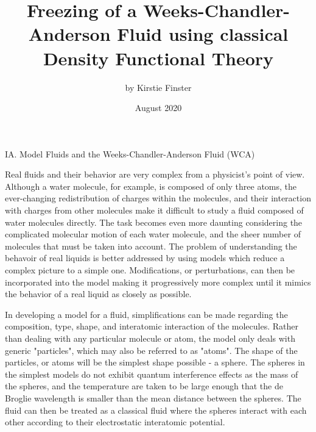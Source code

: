 \documentclass[12pt]{article}
\title{Freezing of a Weeks-Chandler-Anderson Fluid using classical Density Functional Theory}
\author{by Kirstie Finster}
\date{August 2020}
\begin{document}
  \maketitle
  \thispagestyle{fancy}

\noindent IA. Model Fluids and the Weeks-Chandler-Anderson Fluid (WCA)

Real fluids and their behavior are very complex from a physicist's point of view. Although a water molecule, for example, is composed of only three atoms, the ever-changing redistribution of charges within the molecules, and their interaction with charges from other molecules make it difficult to study a fluid composed of water molecules directly. The task becomes even more daunting considering the complicated molecular motion of each water molecule, and the sheer number of molecules that must be taken into account. 
The problem of understanding the behavoir of real liquids is better addressed by using models which reduce a complex picture to a simple one. Modifications, or perturbations, can then be incorporated into the model making it progressively more complex until it mimics the behavior of a real liquid as closely as possible.

In developing a model for a fluid, simplifications can be made regarding the composition, type, shape, and interatomic interaction of the molecules. Rather than dealing with any particular molecule or atom, the model only deals with generic "particles", which may also be referred to as "atoms". The shape of the particles, or atoms will be the simplest shape possible - a sphere. The spheres in the simplest models do not exhibit quantum interference effects as the mass of the spheres, and the temperature are taken to be large enough that the de Broglie wavelength is smaller than the mean distance between the spheres. The fluid can then be treated as a classical fluid where the spheres interact with each other according to their electrostatic interatomic potential. 
\end{document}
